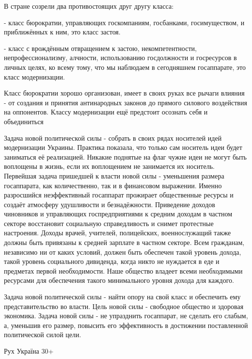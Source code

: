 В стране созрели два противостоящих друг другу класса:

- класс бюрократии, управляющих госкомпаниям, госбанками, госимуществом, и
приближённых к ним, это класс застоя.

- класс с врождённым отвращением к застою, некомпетентности,
непрофессионализму, алчности, использованию госдолжности и госресурсов в личных
целях, ко всему тому, что мы наблюдаем в сегодняшнем госаппарате, это класс
модернизации.

Класс бюрократии хорошо организован, имеет в своих руках все рычаги влияния -
от создания и принятия антинародных законов до прямого силового воздействия на
оппонентов. Классу модернизации ещё предстоит осознать себя и объединиться

Задача новой политической силы - собрать в своих рядах носителей идей
модернизации Украины. Практика показала, что только сам носитель идеи будет
заниматься её реализацией. Никакие поднятые на флаг чужие идеи не могут быть
воплощены в жизнь, если их воплощением не занимается их носитель. Первейшая
задача пришедшей к власти новой силы - уменьшения размера госаппарата, как
количественно, так и в финансовом выражении. Именно разросшийся неэффективный
госаппарат прожирает общественные ресурсы и создаёт атмосферу удушливости и
безнадёжности. Приведение доходов чиновников и управляющих госпредприятиями к
средним доходам в частном секторе восстановит социальную справедливость и
снимет протестные настроения. Доходы врачей, учителей, полицейских,
военнослужащий также должны быть привязаны к средней зарплате в частном
секторе. Всем гражданам, независимо ни от каких условий, должен быть обеспечен
такой уровень дохода, такой уровень социального дивиденда, когда никто не
нуждается в еде и предметах первой необходимости. Наше общество владеет всеми
необходимыми ресурсами для обеспечения такого минимального уровня дохода для
каждого.

Задача новой политической силы - найти опору на свой класс и обеспечить ему
представительство во власти. Цель новой силы - свободное общество и здоровая
экономика. Задача новой силы - не упразднить госаппарат, не сделать его слабым,
а, уменьшив его размер, повысить его эффективность в достижении поставленной
политической силой цели.

Рух Україна 30+
